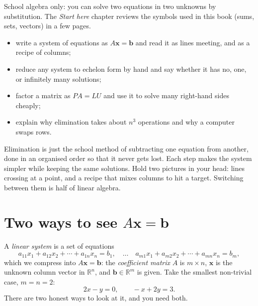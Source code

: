 \begin{rulebox}
School algebra only: you can solve two equations in two unknowns by substitution. The \emph{Start here} chapter reviews the symbols used in this book (sums, sets, vectors) in a few pages.
\end{rulebox}
\begin{wins}
\begin{itemize}
\item write a system of equations as $A\mathbf x=\mathbf b$ and read it as lines meeting, and as a recipe of columns;
\item reduce any system to echelon form by hand and say whether it has no, one, or infinitely many solutions;
\item factor a matrix as $PA=LU$ and use it to solve many right-hand sides cheaply;
\item explain why elimination takes about $n^3$ operations and why a computer swaps rows.
\end{itemize}
\end{wins}
\begin{principle}
Elimination is just the school method of subtracting one equation from another, done in an organised order so that it never gets lost. Each step makes the system simpler while keeping the same solutions. Hold two pictures in your head: lines crossing at a point, and a recipe that mixes columns to hit a target. Switching between them is half of linear algebra.
\end{principle}

\section{Two ways to see \texorpdfstring{$A\mathbf{x}=\mathbf{b}$}{Ax = b}}\label{sec:rowcol}

A \emph{linear system} is a set of equations
\[
  a_{11}x_1 + a_{12}x_2 + \cdots + a_{1n}x_n = b_1,
  \quad\ldots\quad
  a_{m1}x_1 + a_{m2}x_2 + \cdots + a_{mn}x_n = b_m,
\]
which we compress into $A\mathbf{x}=\mathbf{b}$: the \emph{coefficient matrix} $A$ is $m\times n$, $\mathbf{x}$ is the unknown column vector in $\mathbb{R}^n$, and $\mathbf{b}\in\mathbb{R}^m$ is given. Take the smallest non-trivial case, $m=n=2$:
\[
  2x - y = 0, \qquad -x + 2y = 3.
\]
There are two honest ways to look at it, and you need both.

